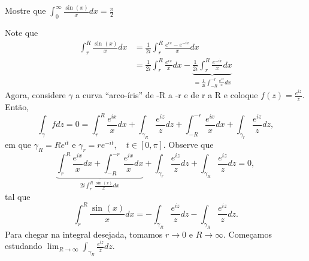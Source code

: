 \documentclass[ComplexAnalysis/complex.tex]{subfiles}
\begin{document}
\begin{exer*}
	Mostre que \(\int_{0}^{\infty}\frac{\sin^{}{(x)}}{x}dx = \frac{\pi }{2}\)

	Note que
	\begin{align*}
		\int_{r}^{R}\frac{\sin^{}{(x)}}{x}dx & = \frac{1}{2i}\int_{r}^{R}\frac{e^{ix}-e^{-ix}}{x}dx                                                                                                     \\
		                                     & = \frac{1}{2i}\int_{r}^{R}\frac{e^{ix}}{x}dx - \underbrace{\frac{1}{2i}\int_{r}^{R}\frac{e^{-ix}}{x}dx}_{= \frac{1}{2i}\int_{-R}^{-r}\frac{e^{ix}}{x}dx}
	\end{align*}
	Agora, considere \(\gamma \) a curva ``arco-íris'' de -R a -r e de r a R e coloque \(f(z) = \frac{e^{iz}}{z}.\) Então,
	\[
		\int_{\gamma }^{}f dz = 0 = \int_{r}^{R}\frac{e^{ix}}{x}dx + \int_{\gamma_{R}}^{}\frac{e^{iz}}{z}dz + \int_{-R}^{-r}\frac{e^{ix}}{x}dx + \int_{\gamma_{r}}^{}\frac{e^{iz}}{z}dz,
	\]
	em que \(\gamma_{R} = Re^{it}\) e \(\gamma_{r} = r e^{-it},\quad t\in [0,\pi ].\) Observe que
	\[
		\underbrace{\int_{r}^{R}\frac{e^{ix}}{x}dx + \int_{-R}^{-r}\frac{e^{ix}}{x}dx}_{2i \int_{r}^{R}\frac{\sin^{}{(x)}}{x}dx} + \int_{\gamma_{r}}^{}\frac{e^{iz}}{z}dz + \int_{\gamma_{R}}^{}\frac{e^{iz}}{z}dz = 0,
	\]
	tal que
	\[
		\int_{r}^{R}\frac{\sin^{}{(x)}}{x}dx = - \int_{\gamma_{R}}^{}\frac{e^{iz}}{z}dz - \int_{\gamma_{R}}^{}\frac{e^{iz}}{z}dz.
	\]
	Para chegar na integral desejada, tomamos \(r\to 0 \) e \(R\to \infty.\) Começamos estudando \(\lim_{R\to \infty}\int_{\gamma_{R}}^{}\frac{e^{iz}}{z}dz\).


\end{exer*}
\end{document}
